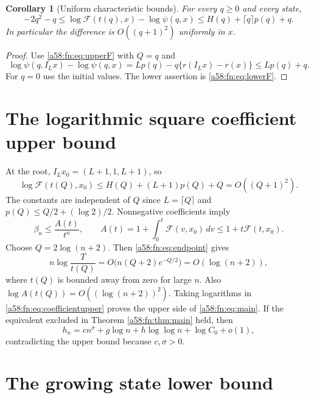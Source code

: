 \documentclass[11pt,letterpaper]{article}
\newtheorem{corollary}[theorem]{Corollary}
\theoremstyle{remark}
\newcommand{\FF}{\mathcal F}
\begin{document}
\begin{corollary}[Uniform characteristic bounds]\label{a58:fn:cor:uniform}
For every $q\ge0$ and every state,
\begin{equation}\label{a58:fn:eq:uniform}
 -2q^2-q\le\log\FF(t(q),x)-\log\psi(q,x)
 \le H(q)+\lceil q\rceil p(q)+q.
\end{equation}
In particular the difference is $O((q+1)^2)$ uniformly in $x$.
\end{corollary}
\begin{proof}
Use \eqref{a58:fn:eq:upperF} with $Q=q$ and
\[
 \log\psi(q,I_Lx)-\log\psi(q,x)
 =Lp(q)-q\{r(I_Lx)-r(x)\}\le Lp(q)+q.
\]
For $q=0$ use the initial values. The lower assertion is \eqref{a58:fn:eq:lowerF}.
\end{proof}

\section{The logarithmic square coefficient upper bound}\label{a58:fn:sec:upper}
At the root, $I_Lx_0=(L+1,1,L+1)$, so
\[
 \log\FF(t(Q),x_0)\le H(Q)+(L+1)p(Q)+Q=O((Q+1)^2).
\]
The constants are independent of $Q$ since $L=\lceil Q\rceil$ and $p(Q)\le Q/2+(\log2)/2$. Nonnegative coefficients imply
\begin{equation}\label{a58:fn:eq:coefficientupper}
 \beta_n\le\frac{A(t)}{t^n},\qquad
 A(t)=1+\int_0^t\FF(v,x_0)\,dv\le1+t\FF(t,x_0).
\end{equation}
Choose $Q=2\log(n+2)$. Then \eqref{a58:fn:eq:endpoint} gives
\[
 n\log\frac{T}{t(Q)}=O\bigl(n(Q+2)e^{-Q/2}\bigr)=O(\log(n+2)),
\]
where $t(Q)$ is bounded away from zero for large $n$. Also
$\log A(t(Q))=O((\log(n+2))^2)$. Taking logarithms in \eqref{a58:fn:eq:coefficientupper} proves the upper side of \eqref{a58:fn:eq:main}. If the equivalent excluded in Theorem \ref{a58:fn:thm:main} held, then
\[
 h_n=cn^\sigma+g\log n+h\log\log n+\log C_0+o(1),
\]
contradicting the upper bound because $c,\sigma>0$.

\section{The growing state lower bound}\label{a58:fn:sec:lower}
\end{document}

